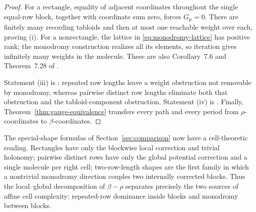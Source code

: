 \documentclass[11pt]{article}
\theoremstyle{definition}
\theoremstyle{remark}
\begin{document}
\begin{proof}
For a rectangle, equality of adjacent coordinates throughout the single equal-row block,
together with coordinate sum zero, forces \(G_\mu=0\).  There are finitely many
recording tabloids and then at most one reachable weight over each, proving (i).  For a
nonrectangle, the lattice in \eqref{eq:monodromy-lattice} has positive rank; the
monodromy construction realizes all its elements, so iteration gives infinitely many
weights in the molecule.  These are also Corollary~7.6 and Theorem~7.28 of
\cite{CLP18}.

Statement (iii) is \cite[Corollary~8.7]{CLP18}: repeated row lengths leave a weight
obstruction not removable by monodromy, whereas pairwise distinct row lengths eliminate
both that obstruction and the tabloid-component obstruction.  Statement (iv) is
\cite[Theorem~8.6]{CLP18}.  Finally, Theorem~\ref{thm:gauge-equivalence} transfers every
path and every period from \(\rho\)-coordinates to \(\beta\)-coordinates.
\end{proof}

The special-shape formulas of Section~\ref{sec:comparison} now have a cell-theoretic
reading.  Rectangles have only the blockwise local correction and trivial holonomy;
pairwise distinct rows have only the global potential correction and a single molecule
per right cell; two-row-length shapes are the first family in which a nontrivial
monodromy direction couples two internally corrected blocks.  Thus the local--global
decomposition of \(\beta-\rho\) separates precisely the two sources of affine cell
complexity: repeated-row dominance inside blocks and monodromy between blocks.
\end{document}

